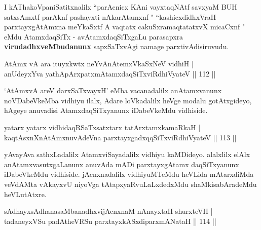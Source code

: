 \begin{artha}
I kAThakoVpaniSatitxnalilx ``parAcnicx KAni vayxtaqNAtf savxyaM BUH satxsAmxtf parAknf pashayxti nAkarAtamxnf " ``kashicxdidhxVraH parxtayxgAtAmxna meYkaSxtf A vaqtatx cakuSx\break ramaqtatatxvX micaCxnf " eMdu AtamxdaqSiTx - avAtamxdaqSiTxgaLu parasapxra \textbf{virudadhxveMbudanunx} sapxSaTxvAgi namage parxtivAdisiruvudu.
\end{artha}


\begin{shl}
AtAmx vA ara ituyxkwtx neYvAnAtemxVkaSxNeV vidhiH |\\
anUdeyxYva yathApArxpatxmAtamxdaqSiTxviRdhiVyateV \hfill || 112 ||
\end{shl}

`AtAmxvA areV darxSaTxvayxH' eMba vacanadalilx anAtamxvanunx noVDabeVkeMba vidhiyu ilalx, Adare loVkadalilx heVge modalu gotAtxgideyo, hAgeye anuvadisi AtamxdaqSiTxyanunx iDabeVkeMdu vidhiside.


\begin{shl}
yatarx yatarx vidhidaqRSaTxsatxtarx tatArx\s \s tamxkamaRkaH |\\
kaqtAsxnXnAtAmxnuvAdeVna parxtayxgadxqqSiTxviRdhiVyateV \hfill || 113 ||
\end{shl}

\begin{artha}
yAvayAva sathxLadalilx AtamxviSayadalilx vidhiyu kaMDideyo. alalxlilx elAlx anAtamxvasutxgaLanunx anuvAda mADi parxtayxgAtamx daqSiTxyanunx iDabeVkeMdu vidhiside. jAcnxnadalilx vidhiyuMTeMdu heVLida mAtarxdiMda veVdAMta vAkayxvU niyoVga tAtapxyaRvuLaLxdedxMdu shaMkisabAradeMdu heVLutAtxre. 
\end{artha}


\begin{shl}
sAdhayxsAdhanasaMbanadhxvijAcnxnaM nAnayxtaH shurxteVH |\\
tadaneyxVSu padAtheVRSu parxtayxkASxdiparxmANataH \hfill || 114 ||
\end{shl}

